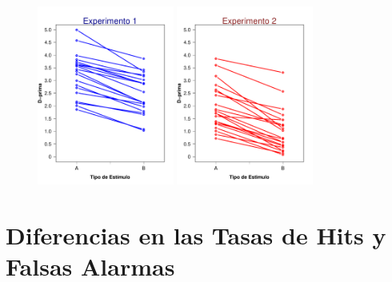 \begin{figure}[th]
\centering
\includegraphics[width=0.40\textwidth]{Figures/Diff_D_E1} \includegraphics[width=0.40\textwidth]{Figures/Diff_D_E2}
\caption[Diferencias en Discriminabilidad (Comprobando diferencias entre condiciones)]{ }
\label{fig:Diff_D}
\end{figure}


\section{Diferencias en las Tasas de Hits y Falsas Alarmas}


